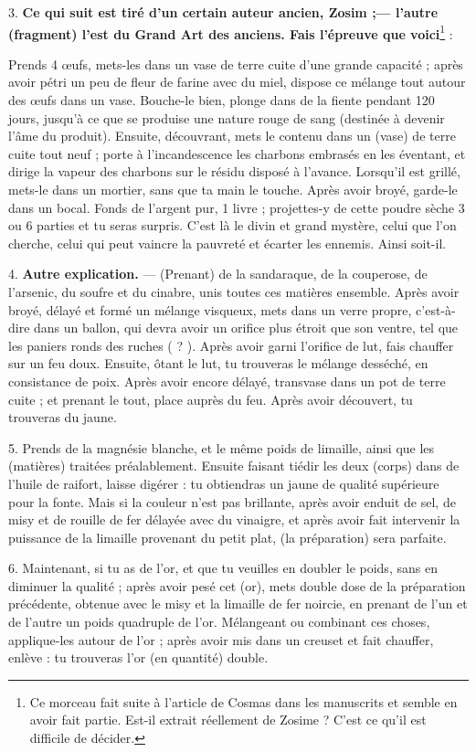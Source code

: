 \documentclass[a4paper, 11pt, oneside, polutonikogreek, french]{article}
\begin{document}
3. \textbf{Ce qui suit est tiré d'un certain auteur ancien, Zosim ;--- l'autre (fragment) l'est du Grand Art des anciens. Fais l'épreuve que voici}\footnote{Ce morceau fait suite à l'article de Cosmas dans les manuscrits et semble en avoir fait partie. Est-il extrait réellement de Zosime ? C'est ce qu'il est difficile de décider.} :

Prends 4 œufs, mets-les dans un vase de terre cuite d'une grande capacité ; après avoir pétri un peu de fleur de farine avec du miel, dispose ce mélange tout autour des œufs dans un vase. Bouche-le bien, plonge dans de la fiente pendant 120 jours, jusqu'à ce que se produise une nature rouge de sang (destinée à devenir l'âme du produit). Ensuite, découvrant, mets le contenu dans un (vase) de terre cuite tout neuf ; porte à l'incandescence les charbons embrasés en les éventant, et dirige la vapeur des charbons sur le résidu disposé à l'avance. Lorsqu'il est grillé, mets-le dans un mortier, sans que ta main le touche. Après avoir broyé, garde-le dans un bocal. Fonds de l'argent pur, 1 livre ; projettes-y de cette poudre sèche 3 ou 6 parties et tu seras surpris. C'est là le divin et grand mystère, celui que l'on cherche, celui qui peut vaincre la pauvreté et écarter les ennemis. Ainsi soit-il.

4. \textbf{Autre explication.} --- (Prenant) de la sandaraque, de la couperose, de l'arsenic, du soufre et du cinabre, unis toutes ces matières ensemble. Après avoir broyé, délayé et formé un mélange visqueux, mets dans un verre propre, c'est-à-dire dans un ballon, qui devra avoir un orifice plus étroit que son ventre, tel que les paniers ronds des ruches ( ? ). Après avoir garni l'orifice de lut, fais chauffer sur un feu doux. Ensuite, ôtant le lut, tu trouveras le mélange desséché, en consistance de poix. Après avoir encore délayé, transvase dans un pot de terre cuite ; et prenant le tout, place auprès du feu. Après avoir découvert, tu trouveras du jaune.

5. Prends de la magnésie blanche, et le même poids de limaille, ainsi que les (matières) traitées préalablement. Ensuite faisant tiédir les deux (corps) dans de l'huile de raifort, laisse digérer : tu obtiendras un jaune de qualité supérieure pour la fonte. Mais si la couleur n'est pas brillante, après avoir enduit de sel, de misy et de rouille de fer délayée avec du vinaigre, et après avoir fait intervenir la puissance de la limaille provenant du petit plat, (la préparation) sera parfaite.

6. Maintenant, si tu as de l'or, et que tu veuilles en doubler le poids, sans en diminuer la qualité ; après avoir pesé cet (or), mets double dose de la préparation précédente, obtenue avec le misy et la limaille de fer noircie, en prenant de l'un et de l'autre un poids quadruple de l'or. Mélangeant ou combinant ces choses, applique-les autour de l'or ; après avoir mis dans un creuset et fait chauffer, enlève : tu trouveras l'or (en quantité) double.
\end{document}

